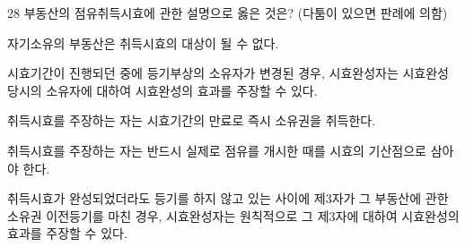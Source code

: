 \begin{question}{28}
부동산의 점유취득시효에 관한 설명으로 옳은 것은? (다툼이 있으면 판례에 의함)
\begin{choices}
  \item 자기소유의 부동산은 취득시효의 대상이 될 수 없다.
  \item 시효기간이 진행되던 중에 등기부상의 소유자가 변경된 경우, 시효완성자는 시효완성 당시의 소유자에 대하여 시효완성의 효과를 주장할 수 있다.
  \item 취득시효를 주장하는 자는 시효기간의 만료로 즉시 소유권을 취득한다.
  \item 취득시효를 주장하는 자는 반드시 실제로 점유를 개시한 때를 시효의 기산점으로 삼아야 한다.
  \item 취득시효가 완성되었더라도 등기를 하지 않고 있는 사이에 제3자가 그 부동산에 관한 소유권 이전등기를 마친 경우, 시효완성자는 원칙적으로 그 제3자에 대하여 시효완성의 효과를 주장할 수 있다.
\end{choices}
\end{question}
